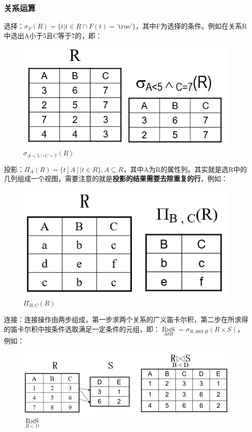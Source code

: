 \documentclass[chapter.computer_science.tex]{subfiles}
\begin{document}
\subsubsection{关系运算}
选择：$ \sigma_F(R)=\{t | t \in R \cap F(t) = \text{'true'}\} $，其中F为选择的条件。例如在关系R中选出A小于5且C等于7的，即：\\
\begin{figure}[H]
    \centering
    \includegraphics[scale=0.25]{./images/0026.png}
    \caption{$ \sigma_{A<5 \cap C=7}(R) $}
\end{figure}
投影：$ \Pi_A(R)=\{ t[A] | t \in R \}, A \subseteq R $，其中A为R的属性列。其实就是选R中的几列组成一个视图，需要注意的就是{\bfseries 投影的结果需要去除重复的行}，例如：\\
\begin{figure}[H]
    \centering
    \includegraphics[scale=0.25]{./images/0027.png}
    \caption{$ \Pi_{B,C}(R) $}
\end{figure}
连接：连接操作由两步组成，第一步求两个关系的广义笛卡尔积，第二步在所求得的笛卡尔积中按条件选取满足一定条件的元组，即：$ \mathop{R \Join S}\limits_{A \theta B}=\sigma_{R.A \theta S.B}(R \times S) $，例如：\\
\begin{figure}[H]
    \centering
    \includegraphics[scale=0.25]{./images/0028.png}
    \caption{$ \mathop{R \Join S}\limits_{B<D} $}
\end{figure}
\end{document}
